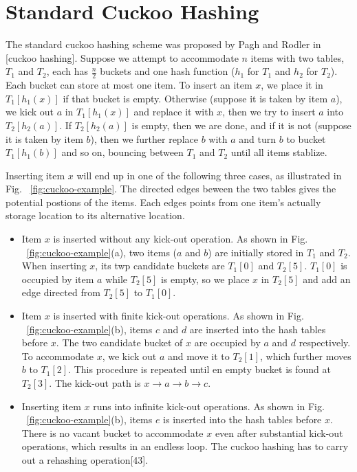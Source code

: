\documentclass[runningheads]{llncs}
\begin{document}
\section{Standard Cuckoo Hashing}
\label{sec:cuckoo}
The standard cuckoo hashing scheme was proposed by Pagh and Rodler in [cuckoo hashing]. Suppose we attempt to accommodate $n$ items with two tables, $T_1$ and $T_2$, each has $\frac{n}{2}$ buckets and one hash function ($h_1$ for $T_1$ and $h_2$ for $T_2$). Each bucket can store at most one item. To insert an item $x$, we place it in $T_1[h_1(x)]$ if that bucket is empty. Otherwise (suppose it is taken by item $a$), we kick out $a$ in $T_1[h_1(x)]$ and replace it with $x$, then we try to insert $a$ into $T_2[h_2(a)]$. If $T_2[h_2(a)]$ is empty, then we are done, and if it is not (suppose it is taken by item $b$), then we further replace $b$ with $a$ and turn $b$ to bucket $T_1[h_1(b)]$ and so on, bouncing between $T_1$ and $T_2$ until all items stablize.

Inserting item $x$ will end up in one of the following three cases, as illustrated in Fig. ~\ref{fig:cuckoo-example}. The directed edges beween the two tables gives the potential postions of the items. Each edges points from one item's actually storage location to its alternative location.

\begin{itemize}
    \item Item $x$ is inserted without any kick-out operation. As shown in Fig. ~\ref{fig:cuckoo-example}(a), two items ($a$ and $b$) are initially stored in $T_1$ and $T_2$. When inserting $x$, its twp candidate buckets are $T_1[0]$ and $T_2[5]$. $T_1[0]$ is occupied by item $a$ while $T_2[5]$ is empty, so we place $x$ in $T_2[5]$ and add an edge directed from $T_2[5]$ to $T_1[0]$.
    \item Item $x$ is inserted with finite kick-out operations. As shown in Fig. ~\ref{fig:cuckoo-example}(b), items $c$ and $d$ are inserted into the hash tables before $x$. The two candidate bucket of $x$ are occupied by $a$ and $d$ respectively. To accommodate $x$, we kick out $a$ and move it to $T_2[1]$, which further moves $b$ to $T_1[2]$. This procedure is repeated until en empty bucket is found at $T_2[3]$. The kick-out path is $x\rightarrow a\rightarrow b\rightarrow c$.
    \item Inserting item $x$ runs into infinite kick-out operations. As shown in Fig. ~\ref{fig:cuckoo-example}(b), items $e$ is inserted into the hash tables before $x$. There is no vacant bucket to accommodate $x$ even after substantial kick-out operations, which results in an endless loop. The cuckoo hashing has to carry out a rehashing operation[43].
\end{itemize}
\end{document}
